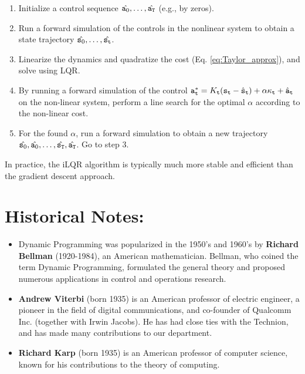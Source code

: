\begin{enumerate}
    \item Initialize a control sequence $\hat{{\tt a}_0},\dots,\hat{{\tt a}_{\tt T}}$ (e.g., by zeros).
    \item Run a forward simulation of the controls in the nonlinear system to obtain a state trajectory $\hat{{\tt s}_0},\dots,\hat{{\tt s}_{\tt t}}$.
    \item Linearize the dynamics and quadratize the cost (Eq. \ref{eq:Taylor_approx}), and solve using LQR.
    \item By running a forward simulation of the control ${\tt a}_{\tt t}^* = K_{\tt t} ({\tt s}_{\tt t} - \hat{{\tt s}}_{\tt t}) + \alpha \kappa_{\tt t} + \hat{{\tt a}}_{\tt t}$ on the non-linear system, perform a line search for the optimal $\alpha$ according to the non-linear cost.
    \item For the found $\alpha$, run a forward simulation to obtain a new trajectory  $\hat{{\tt s}_0},\hat{{\tt a}_0},\dots,\hat{{\tt s}_{\tt T}},\hat{{\tt a}_{\tt T}}$. Go to step 3.
\end{enumerate}

In practice, the iLQR algorithm is typically much more stable and efficient than the gradient descent approach.

\section{Historical Notes:}
\begin{itemize}
  \item Dynamic Programming was popularized in the 1950's and 1960's by \textbf{Richard Bellman} (1920-1984), an American mathematician. Bellman, who coined the term Dynamic Programming, formulated the general theory and proposed numerous applications in control and operations research.
  \item \textbf{Andrew Viterbi} (born 1935) is an American professor of electric engineer, a pioneer in the field of digital communications, and co-founder of Qualcomm Inc. (together with Irwin Jacobs). He has had close ties with the Technion, and has made many contributions to our department.
  \item \textbf{Richard Karp} (born 1935) is an American professor
  of computer science, known for his contributions to the theory of
  computing.
\end{itemize}




%
